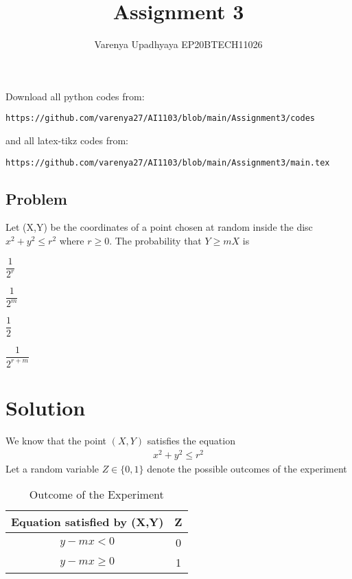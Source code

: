 \documentclass[journal,12pt,twocolumn]{IEEEtran}
\title{Assignment 3}
\author{Varenya Upadhyaya EP20BTECH11026}
\date{}
\theoremstyle{remark}
\numberwithin{equation}{subsection}
\begin{document}
\maketitle
Download all python codes from:
\begin{lstlisting}
https://github.com/varenya27/AI1103/blob/main/Assignment3/codes
\end{lstlisting}
and all latex-tikz codes from:
\begin{lstlisting}
https://github.com/varenya27/AI1103/blob/main/Assignment3/main.tex
\end{lstlisting}
\maketitle   
\begin{center}
\section*{\textbf{Problem}}
\end{center}
Let (X,Y) be the coordinates of a point chosen at random inside the disc $x^2 + y^2 \leq r^2$ where $r\geq 0$. The probability that $Y \geq mX$ is
\begin{enumerate}[label = (\alph*)]
\begin{multicols}{2}
\setlength\itemsep{2em}
    \item $\dfrac{1}{2^r}$
    \item $\dfrac{1}{2^m}$
    \item $\dfrac{1}{2}$
    \item $\dfrac{1}{2^{r+m}}$
\end{multicols}
\end{enumerate}

\maketitle
\section*{\textbf{Solution}}
We know that the point $(X,Y)$ satisfies the equation 
\begin{align}
x^2 + y^2 \leq r^2 
\end{align}
Let a random variable $Z\in \{0,1\}$ denote the possible outcomes of the experiment
\begin{table}[h]
\centering
    \begin{tabular}{|c|c|}
        \hline
        Equation satisfied by (X,Y)& Z    \\\hline
        $y-mx<0$ & 0    \\\hline
        $y-mx\geq0$ & 1 \\\hline
    \end{tabular}
\caption{Outcome of the Experiment}
\label{table=1}
\end{table}
\end{document}

